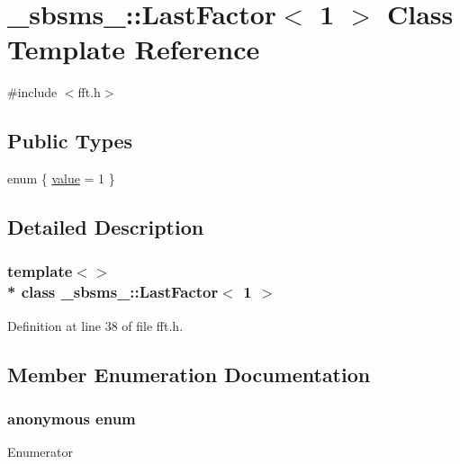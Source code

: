 \hypertarget{class__sbsms___1_1_last_factor_3_011_01_4}{}\section{\+\_\+sbsms\+\_\+\+:\+:Last\+Factor$<$ 1 $>$ Class Template Reference}
\label{class__sbsms___1_1_last_factor_3_011_01_4}


{\ttfamily \#include $<$fft.\+h$>$}

\subsection*{Public Types}
\begin{DoxyCompactItemize}
\item 
enum \{ \hyperlink{class__sbsms___1_1_last_factor_3_011_01_4_a471785c8b71b575dff3ce0473b7a57e3a3ada52d7b747711ab97fb0bced10f6bd}{value} = 1
 \}
\end{DoxyCompactItemize}


\subsection{Detailed Description}
\subsubsection*{template$<$$>$\\*
class \+\_\+sbsms\+\_\+\+::\+Last\+Factor$<$ 1 $>$}



Definition at line 38 of file fft.\+h.



\subsection{Member Enumeration Documentation}
\subsubsection[{\texorpdfstring{anonymous enum}{anonymous enum}}]{\setlength{\rightskip}{0pt plus 5cm}anonymous enum}\hypertarget{class__sbsms___1_1_last_factor_3_011_01_4_a471785c8b71b575dff3ce0473b7a57e3}{}\label{class__sbsms___1_1_last_factor_3_011_01_4_a471785c8b71b575dff3ce0473b7a57e3}
\begin{Desc}
\item[Enumerator]\par
\begin{description}
\item[{\em 
value\hypertarget{class__sbsms___1_1_last_factor_3_011_01_4_a471785c8b71b575dff3ce0473b7a57e3a3ada52d7b747711ab97fb0bced10f6bd}{}\label{class__sbsms___1_1_last_factor_3_011_01_4_a471785c8b71b575dff3ce0473b7a57e3a3ada52d7b747711ab97fb0bced10f6bd}
}]\end{description}
\end{Desc}


